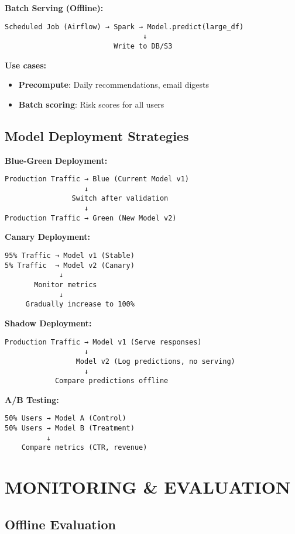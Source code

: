 \documentclass[8pt,landscape]{article}
\begin{document}
\begin{multicols}{3}
\textbf{Batch Serving (Offline):}
\begin{verbatim}
Scheduled Job (Airflow) → Spark → Model.predict(large_df)
                                 ↓
                          Write to DB/S3
\end{verbatim}

\textbf{Use cases:}
\begin{itemize}
\item \textbf{Precompute}: Daily recommendations, email digests
\item \textbf{Batch scoring}: Risk scores for all users
\end{itemize}

\subsection*{Model Deployment Strategies}

\textbf{Blue-Green Deployment:}
\begin{verbatim}
Production Traffic → Blue (Current Model v1)
                   ↓
                Switch after validation
                   ↓
Production Traffic → Green (New Model v2)
\end{verbatim}

\textbf{Canary Deployment:}
\begin{verbatim}
95% Traffic → Model v1 (Stable)
5% Traffic  → Model v2 (Canary)
             ↓
       Monitor metrics
             ↓
     Gradually increase to 100%
\end{verbatim}

\textbf{Shadow Deployment:}
\begin{verbatim}
Production Traffic → Model v1 (Serve responses)
                   ↓
                 Model v2 (Log predictions, no serving)
                   ↓
            Compare predictions offline
\end{verbatim}

\textbf{A/B Testing:}
\begin{verbatim}
50% Users → Model A (Control)
50% Users → Model B (Treatment)
          ↓
    Compare metrics (CTR, revenue)
\end{verbatim}

\section*{MONITORING \& EVALUATION}

\subsection*{Offline Evaluation}


\end{multicols}
\end{document}
